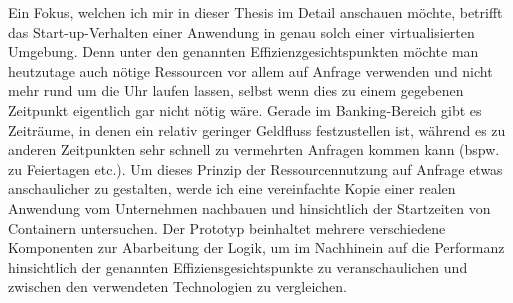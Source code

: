 Ein Fokus, welchen ich mir in dieser Thesis im Detail anschauen möchte, betrifft das Start-up-Verhalten einer Anwendung in genau solch einer virtualisierten Umgebung. Denn unter den genannten Effizienzgesichtspunkten möchte man heutzutage auch nötige Ressourcen vor allem auf Anfrage verwenden und nicht mehr rund um die Uhr laufen lassen, selbst wenn dies zu einem gegebenen Zeitpunkt eigentlich gar nicht nötig wäre. Gerade im Banking-Bereich gibt es Zeiträume, in denen ein relativ geringer Geldfluss festzustellen ist, während es zu anderen Zeitpunkten sehr schnell zu vermehrten Anfragen kommen kann (bspw. zu Feiertagen etc.). Um dieses Prinzip der Ressourcennutzung auf Anfrage etwas anschaulicher zu gestalten, werde ich eine vereinfachte Kopie einer realen Anwendung vom Unternehmen nachbauen und hinsichtlich der Startzeiten von Containern untersuchen. Der Prototyp beinhaltet mehrere verschiedene Komponenten zur Abarbeitung der Logik, um im Nachhinein auf die Performanz hinsichtlich der genannten Effiziensgesichtspunkte zu veranschaulichen und zwischen den verwendeten Technologien zu vergleichen.
